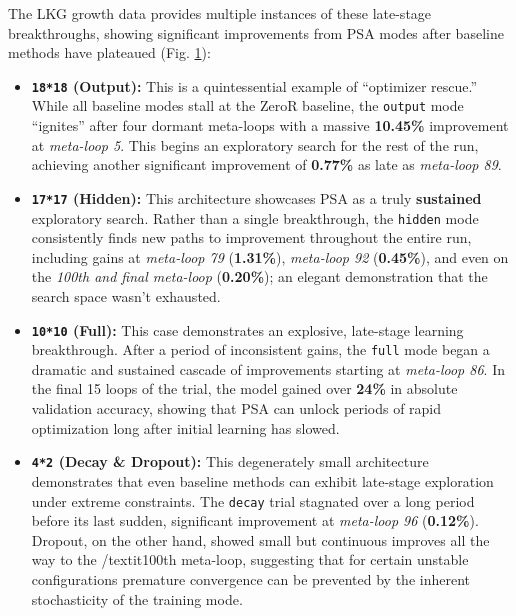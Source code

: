 \documentclass[conference]{IEEEtran}
\begin{document}
\begin{figure}[h]
    \label{fig:converge_plots_late_breakthroughs}
\end{figure}

The LKG growth data provides multiple instances of these late-stage breakthroughs, showing significant improvements from PSA modes after baseline methods have plateaued (Fig. \ref{fig:converge_plots_late_breakthroughs}):
\begin{itemize}

    \item \textbf{\texttt{18*18} (Output):} This is a quintessential example of ``optimizer rescue.'' While all baseline modes stall at the ZeroR baseline, the \verb|output| mode ``ignites'' after four dormant meta-loops with a massive \textbf{10.45\%} improvement at \textit{meta-loop 5}. This begins an exploratory search for the rest of the run, achieving another significant improvement of \textbf{0.77\%} as late as \textit{meta-loop 89}.
    \item \textbf{\texttt{17*17} (Hidden):} This architecture showcases PSA as a truly \textbf{sustained} exploratory search. Rather than a single breakthrough, the \verb|hidden| mode consistently finds new paths to improvement throughout the entire run, including gains at \textit{meta-loop 79} (\textbf{1.31\%}), \textit{meta-loop 92} (\textbf{0.45\%}), and even on the \textit{100th and final meta-loop} (\textbf{0.20\%}); an elegant demonstration that the search space wasn't exhausted.
    \item \textbf{\texttt{10*10} (Full):} This case demonstrates an explosive, late-stage learning breakthrough. After a period of inconsistent gains, the \verb|full| mode began a dramatic and sustained cascade of improvements starting at \textit{meta-loop 86}. In the final 15 loops of the trial, the model gained over \textbf{24\%} in absolute validation accuracy, showing that PSA can unlock periods of rapid optimization long after initial learning has slowed.
    \item \textbf{\texttt{4*2} (Decay \& Dropout):} This degenerately small architecture demonstrates that even baseline methods can exhibit late-stage exploration under extreme constraints. The \verb|decay| trial stagnated over a long period before its last sudden, significant improvement at \textit{meta-loop 96} (\textbf{0.12\%}). Dropout, on the other hand, showed small but continuous improves all the way to the /textit{100th meta-loop}, suggesting that for certain unstable configurations premature convergence can be prevented by the inherent stochasticity of the training mode.
\end{itemize}
\end{document}
